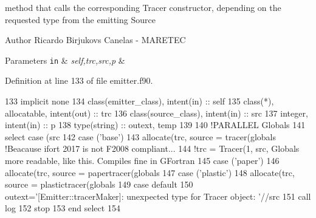 method that calls the corresponding Tracer constructor, depending on the requested type from the emitting Source 

\begin{DoxyAuthor}{Author}
Ricardo Birjukovs Canelas -\/ M\+A\+R\+E\+T\+EC 
\end{DoxyAuthor}

\begin{DoxyParams}[1]{Parameters}
\mbox{\tt in}  & {\em self,trc,src,p} & \\
\hline
\end{DoxyParams}


Definition at line 133 of file emitter.\+f90.


\begin{DoxyCode}
133     \textcolor{keywordtype}{implicit none}
134     \textcolor{keywordtype}{class}(emitter\_class), \textcolor{keywordtype}{intent(in)} :: self
135     \textcolor{keywordtype}{class}(*), \textcolor{keywordtype}{allocatable}, \textcolor{keywordtype}{intent(out)} :: trc
136     \textcolor{keywordtype}{class}(source\_class), \textcolor{keywordtype}{intent(in)} :: src
137     \textcolor{keywordtype}{integer}, \textcolor{keywordtype}{intent(in)} :: p
138     \textcolor{keywordtype}{type}(string) :: outext, temp
139 
140     \textcolor{comment}{!PARALLEL Globals%
141     \textcolor{keywordflow}{select case} (src%
142     \textcolor{keywordflow}{case} (\textcolor{stringliteral}{'base'})
143         \textcolor{keyword}{allocate}(trc, source = tracer(globals%
      !Beacause ifort 2017 is not F2008 compliant...}
144         \textcolor{comment}{!trc = Tracer(1, src, Globals%
       more readable, like this. Compiles fine in GFortran}
145     \textcolor{keywordflow}{case} (\textcolor{stringliteral}{'paper'})
146         \textcolor{keyword}{allocate}(trc, source = papertracer(globals%
147     \textcolor{keywordflow}{case} (\textcolor{stringliteral}{'plastic'})
148         \textcolor{keyword}{allocate}(trc, source = plastictracer(globals%
149 \textcolor{keywordflow}{        case default}
150         outext=\textcolor{stringliteral}{'[Emitter::tracerMaker]: unexpected type for Tracer object: '}//src%
151         \textcolor{keyword}{call }log%
152         stop
153 \textcolor{keywordflow}{    end select}
154 
\end{DoxyCode}
